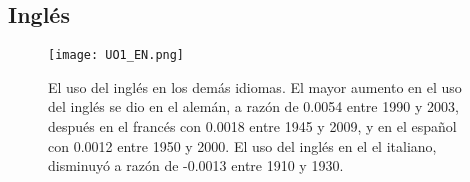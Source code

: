 




\subsection{Inglés} %

\begin{figure}[h!]
	\centering
	\texttt{[image: UO1\_EN.png]}
	\caption{El uso del inglés en los demás idiomas. El mayor aumento en el uso del inglés se dio en el alemán, a razón de 0.0054  entre 1990 y 2003, después en el francés con 0.0018 entre 1945 y 2009, y en el español con 0.0012 entre 1950 y 2000. El uso del inglés en el el italiano, disminuyó a razón de -0.0013 entre 1910 y 1930.}
	\label{fig.UO_EN}
\end{figure} 

